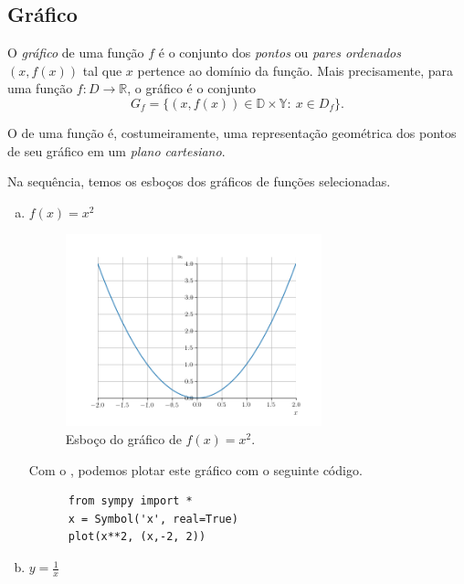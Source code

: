 \subsection{Gráfico}

O \emph{gráfico} de uma função $f$ é o conjunto dos \emph{pontos} ou \emph{pares ordenados} $(x, f(x))$ tal que $x$ pertence ao domínio da função. Mais precisamente, para uma função $f:D\to \mathbb{R}$, o gráfico é o conjunto
\begin{equation}
  G_f = \{(x, f(x))\in\mathbb{D}\times\mathbb{Y}:~ x\in D_f\}.
\end{equation}

O  de uma função é, costumeiramente, uma representação geométrica dos pontos de seu gráfico em um \emph{plano cartesiano}.

\begin{ex}\label{ex:grafico}
  Na sequência, temos os esboços dos gráficos de funções selecionadas.
  \begin{enumerate}[a)]
  \item $f(x) = x^2$

    \begin{figure}[H]
      \centering
      \includegraphics[width=0.7\textwidth]{./cap_funcao/dados/fig_ex_grafico/fig_ex_grafico_x2}
      \caption{Esboço do gráfico de $f(x)=x^2$.}
    \end{figure}

    \ifispython
    Com o {\sympy}, podemos plotar este gráfico com o seguinte código.
    \begin{lstlisting}
      from sympy import *
      x = Symbol('x', real=True)
      plot(x**2, (x,-2, 2))
    \end{lstlisting}
    \fi

  \item $\displaystyle y=\frac{1}{x}$


\end{enumerate}
\end{ex}
